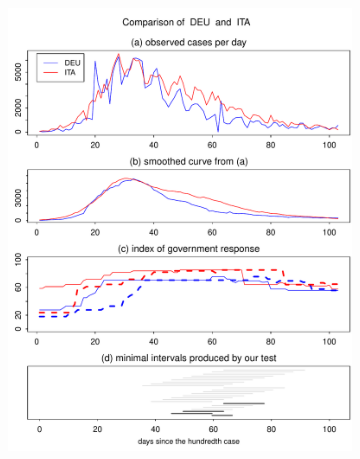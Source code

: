 \documentclass[a4paper,12pt]{article}
\numberwithin{equation}{section}
\begin{document}
\begin{figure}[t!]
\begin{subfigure}[b]{0.475\textwidth}
\includegraphics[width=\textwidth]{plots/DEU_vs_ITA}
\end{subfigure}\hspace{0.55cm}
\begin{subfigure}[b]{0.475\textwidth}

\end{subfigure}
\end{figure}
\end{document}
